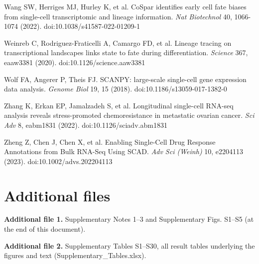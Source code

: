 \documentclass[11pt,a4paper]{article}
\begin{document}
\noindent Wang SW, Herriges MJ, Hurley K, et al. CoSpar identifies early cell fate biases from single-cell transcriptomic and lineage information. \emph{Nat Biotechnol} 40, 1066-1074 (2022). doi:10.1038/s41587-022-01209-1\par\vspace{2pt}

\noindent Weinreb C, Rodriguez-Fraticelli A, Camargo FD, et al. Lineage tracing on transcriptional landscapes links state to fate during differentiation. \emph{Science} 367, eaaw3381 (2020). doi:10.1126/science.aaw3381 \par\vspace{2pt}

\noindent Wolf FA, Angerer P, Theis FJ. SCANPY: large-scale single-cell gene expression data analysis. \emph{Genome Biol} 19, 15 (2018). doi:10.1186/s13059-017-1382-0\par\vspace{2pt}

\noindent Zhang K, Erkan EP, Jamalzadeh S, et al. Longitudinal single-cell RNA-seq analysis reveals stress-promoted chemoresistance in metastatic ovarian cancer. \emph{Sci Adv} 8, eabm1831 (2022). doi:10.1126/sciadv.abm1831 \par\vspace{2pt}

\noindent Zheng Z, Chen J, Chen X, et al. Enabling Single-Cell Drug Response Annotations from Bulk RNA-Seq Using SCAD. \emph{Adv Sci (Weinh)} 10, e2204113 (2023). doi:10.1002/advs.202204113 \par\vspace{2pt}

\section*{Additional files}

\textbf{Additional file 1.} Supplementary Notes 1--3 and Supplementary Figs. S1--S5 (at the end of this document).

\textbf{Additional file 2.} Supplementary Tables S1--S30, all result tables underlying the figures and text (Supplementary\_Tables.xlsx).
\end{document}
